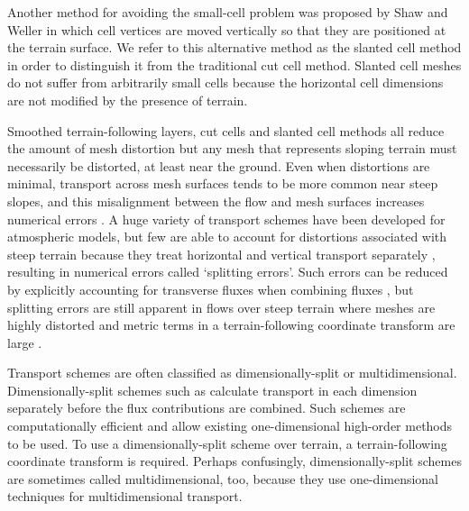 Another method for avoiding the small-cell problem was proposed by Shaw and Weller \citep{shaw-weller2016} in which cell vertices are moved vertically so that they are positioned at the terrain surface.  We refer to this alternative method as the slanted cell method in order to distinguish it from the traditional cut cell method.  Slanted cell meshes do not suffer from arbitrarily small cells because the horizontal cell dimensions are not modified by the presence of terrain.

Smoothed terrain-following layers, cut cells and slanted cell methods all reduce the amount of mesh distortion but any mesh that represents sloping terrain must necessarily be distorted, at least near the ground.
Even when distortions are minimal, transport across mesh surfaces tends to be more common near steep slopes, and this misalignment between the flow and mesh surfaces increases numerical errors \citep{leonard1993,schaer2002,shaw-weller2016}.
A huge variety of transport schemes have been developed for atmospheric models, but few are able to account for distortions associated with steep terrain because they treat horizontal and vertical transport separately \citep{kent2014}, resulting in numerical errors called `splitting errors'.
Such errors can be reduced by explicitly accounting for transverse fluxes when combining fluxes \citep{leonard1996}, but splitting errors are still apparent in flows over steep terrain where meshes are highly distorted and metric terms in a terrain-following coordinate transform are large \citep{weller2017}.

Transport schemes are often classified as dimensionally-split or multidimensional.
Dimensionally-split schemes such as \citep{lin-rood1996,katta2015} calculate transport in each dimension separately before the flux contributions are combined.  Such schemes are computationally efficient and allow existing one-dimensional high-order methods to be used.  To use a dimensionally-split scheme over terrain, a terrain-following coordinate transform is required.
Perhaps confusingly, dimensionally-split schemes are sometimes called multidimensional, too, because they use one-dimensional techniques for multidimensional transport.

